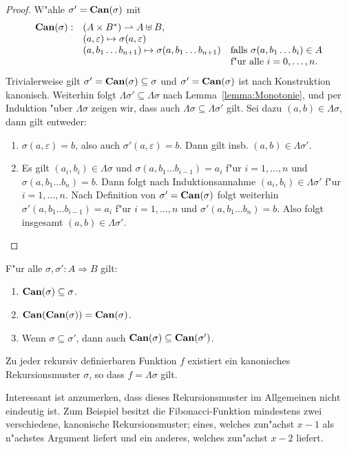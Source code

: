 \documentclass[12pt,a4paper]{article}
\begin{document}
\begin{proof}
  W"ahle $\sigma' = \mathbf{Can}(\sigma)$ mit
  \[\begin{array}{rll}
    \mathbf{Can}(\sigma):& (A \times B^*) \rightharpoonup A \uplus B, \\
    & (a,\varepsilon) \mapsto \sigma(a,\varepsilon) \\
    & (a,b_1 \ldots b_{n+1}) \mapsto \sigma(a,b_1 \ldots b_{n+1}) & \text{falls $\sigma(a,b_1 \ldots b_i)\in A$} \\
    && \text{f"ur alle $i =0,\ldots,n$.}
  \end{array}\]
  Trivialerweise gilt $\sigma' = \mathbf{Can}(\sigma) \subseteq \sigma$ und $\sigma' = \mathbf{Can}(\sigma)$ ist nach
  Konstruktion kanonisch. Weiterhin folgt $\Lambda \sigma' \subseteq \Lambda \sigma$ nach
  Lemma~\ref{lemma:Monotonie}, und per Induktion "uber $\Lambda \sigma$ zeigen wir, dass auch
  $\Lambda \sigma \subseteq \Lambda \sigma'$ gilt. Sei dazu $(a,b) \in \Lambda \sigma$, dann
  gilt entweder:
  \begin{enumerate}
  \item $\sigma(a,\varepsilon)=b$, also auch $\sigma'(a,\varepsilon)=b$. Dann gilt insb. $(a,b)\in\Lambda\sigma'$.
  \item Es gilt $(a_i,b_i)\in\Lambda \sigma$ und $\sigma(a,b_1 \ldots b_{i-1})=a_i$ f"ur $i=1,\ldots,n$ und
    $\sigma(a,b_1 \ldots b_n) = b$. Dann folgt nach Induktionsannahme $(a_i,b_i) \in \Lambda \sigma'$ f"ur
    $i=1,\ldots,n$. Nach Definition von $\sigma' = \mathbf{Can}(\sigma)$ folgt weiterhin $\sigma'(a,b_1 \ldots b_{i-1})=a_i$
    f"ur $i=1,\ldots,n$ und $\sigma'(a,b_1 \ldots b_n)=b$. Also folgt insgesamt $(a,b) \in \Lambda\sigma'$.
  \end{enumerate}
\end{proof}

\begin{corollary}
  F"ur alle $\sigma,\sigma':A \Rightarrow B$ gilt:
  \begin{enumerate}
  \item $\mathbf{Can}(\sigma) \subseteq \sigma$.
  \item $\mathbf{Can}(\mathbf{Can}(\sigma)) = \mathbf{Can}(\sigma)$.
  \item Wenn $\sigma \subseteq \sigma'$, dann auch $\mathbf{Can}(\sigma) \subseteq \mathbf{Can}(\sigma')$.
  \end{enumerate}
\end{corollary}

\begin{lemma}
  Zu jeder rekursiv definierbaren Funktion $f$ existiert ein kanonisches Rekursionsmuster $\sigma$,
  so dass $f = \Lambda \sigma$ gilt.
\end{lemma}
Interessant ist anzumerken, dass dieses Rekursionsmuster im Allgemeinen nicht eindeutig ist. Zum
Beispiel besitzt die Fibonacci-Funktion mindestens zwei verschiedene, kanonische Rekursionsmuster;
eines, welches zun"achst $x-1$ als n"achstes Argument liefert und ein anderes, welches zun"achst
$x-2$ liefert.
\end{document}
